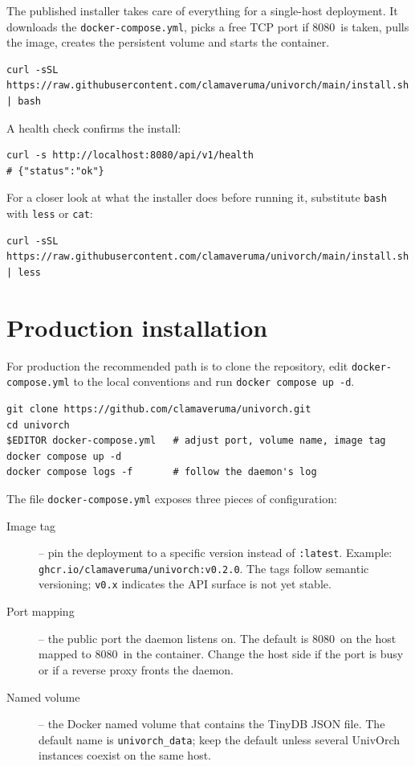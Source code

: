 The published installer takes care of everything for a single-host
deployment. It downloads the
\texttt{docker-compose.yml}, picks a free TCP port if 8080~is
taken, pulls the image, creates the persistent volume and starts the
container.

\begin{verbatim}
curl -sSL https://raw.githubusercontent.com/clamaveruma/univorch/main/install.sh | bash
\end{verbatim}

A health check confirms the install:

\begin{verbatim}
curl -s http://localhost:8080/api/v1/health
# {"status":"ok"}
\end{verbatim}

For a closer look at what the installer does before running it,
substitute \texttt{bash} with \texttt{less} or \texttt{cat}:

\begin{verbatim}
curl -sSL https://raw.githubusercontent.com/clamaveruma/univorch/main/install.sh | less
\end{verbatim}

\section{Production installation}

For production the recommended path is to clone the repository,
edit \texttt{docker-compose.yml} to the local conventions and run
\texttt{docker compose up -d}.

\begin{verbatim}
git clone https://github.com/clamaveruma/univorch.git
cd univorch
$EDITOR docker-compose.yml   # adjust port, volume name, image tag
docker compose up -d
docker compose logs -f       # follow the daemon's log
\end{verbatim}

The file \texttt{docker-compose.yml} exposes three pieces of
configuration:

\begin{description}
  \item[Image tag] -- pin the deployment to a specific version
        instead of \texttt{:latest}. Example:
        \texttt{ghcr.io/clamaveruma/univorch:v0.2.0}. The tags
        follow semantic versioning; \texttt{v0.x} indicates the
        API surface is not yet stable.
  \item[Port mapping] -- the public port the daemon listens on. The
        default is 8080~on the host mapped to 8080~in the
        container. Change the host side if the port is busy or if
        a reverse proxy fronts the daemon.
  \item[Named volume] -- the Docker named volume that contains the
        TinyDB JSON file. The default name is
        \texttt{univorch\_data}; keep the default unless several
        UnivOrch instances coexist on the same host.
\end{description}


